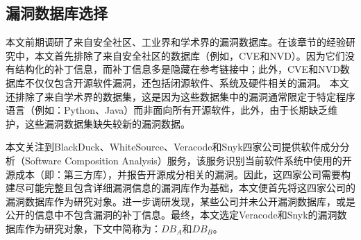 \subsection{漏洞数据库选择}
本文前期调研了来自安全社区、工业界和学术界的漏洞数据库。在该章节的经验研究中，本文首先排除了来自安全社区的数据库（例如，CVE和NVD）。因为它们没有结构化的补丁信息，而补丁信息多是隐藏在参考链接中；此外，CVE和NVD数据库不仅仅包含开源软件漏洞，还包括闭源软件、系统及硬件相关的漏洞。
本文还排除了来自学术界的数据集\cite{ponta2019manually,fan2020ac,jimenez2018enabling,gkortzis2018vulinoss,namrud2019androvul,li2017large,liu2020large,antal2020exploring}，这是因为这些数据集中的漏洞通常限定于特定程序语言（例如：Python、Java）而非面向所有开源软件，此外，由于长期缺乏维护，这些漏洞数据集缺失较新的漏洞数据。


本文关注到BlackDuck\cite{blackduck}、WhiteSource\cite{whitesource}、Veracode\cite{veracode}和Snyk\cite{snyk}四家公司提供软件成分分析（Software Composition Analysis）服务，该服务识别当前软件系统中使用的开源成本（即：第三方库），并报告开源成分相关的漏洞。因此，这四家公司需要构建尽可能完整且包含详细漏洞信息的漏洞库作为基础，本文便首先将这四家公司的漏洞数据库作为研究对象。进一步调研发现，某些公司并未公开漏洞数据库，或是公开的信息中不包含漏洞的补丁信息。最终，本文选定Veracode和Snyk的漏洞数据库作为研究对象，下文中简称为：$DB_A$和$DB_B$。



